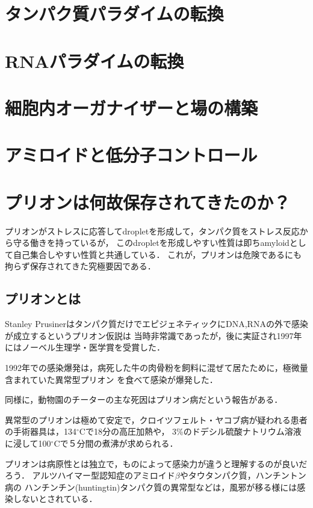 \documentclass[uplatex, dvipdfmx]{jsreport}
\begin{document}
\chapter{タンパク質パラダイムの転換}

\chapter{RNAパラダイムの転換}
\chapter{細胞内オーガナイザーと場の構築}
\chapter{アミロイドと低分子コントロール}
\chapter{プリオンは何故保存されてきたのか？}\label{chapter-prion}

プリオンがストレスに応答してdropletを形成して，タンパク質をストレス反応から守る働きを持っているが，
このdropletを形成しやすい性質は即ちamyloidとして自己集合しやすい性質と共通している．
これが，プリオンは危険であるにも拘らず保存されてきた究極要因である．

\section{プリオンとは}

Stanley Prusinerはタンパク質だけでエピジェネティックにDNA,RNAの外で感染が成立するというプリオン仮説は
当時非常識であったが，後に実証され1997年にはノーベル生理学・医学賞を受賞した．
\begin{example}[プリオン病]
    1992年での感染爆発は，病死した牛の肉骨粉を飼料に混ぜて居たために，極微量含まれていた異常型プリオン
    を食べて感染が爆発した．

    同様に，動物園のチーターの主な死因はプリオン病だという報告がある．
\end{example}
\begin{example}
    異常型のプリオンは極めて安定で，クロイツフェルト・ヤコブ病が疑われる患者の手術器具は，134$^\circ\mathrm{C}$で18分の高圧加熱や，
    3\%のドデシル硫酸ナトリウム溶液に浸して100$^\circ\mathrm{C}$で５分間の煮沸が求められる．
\end{example}

プリオンは病原性とは独立で，ものによって感染力が違うと理解するのが良いだろう．
アルツハイマー型認知症のアミロイド$\beta$やタウタンパク質，ハンチントン病の
ハンチンチン(huntingtin)タンパク質の異常型などは，風邪が移る様には感染しないとされている．
\end{document}
